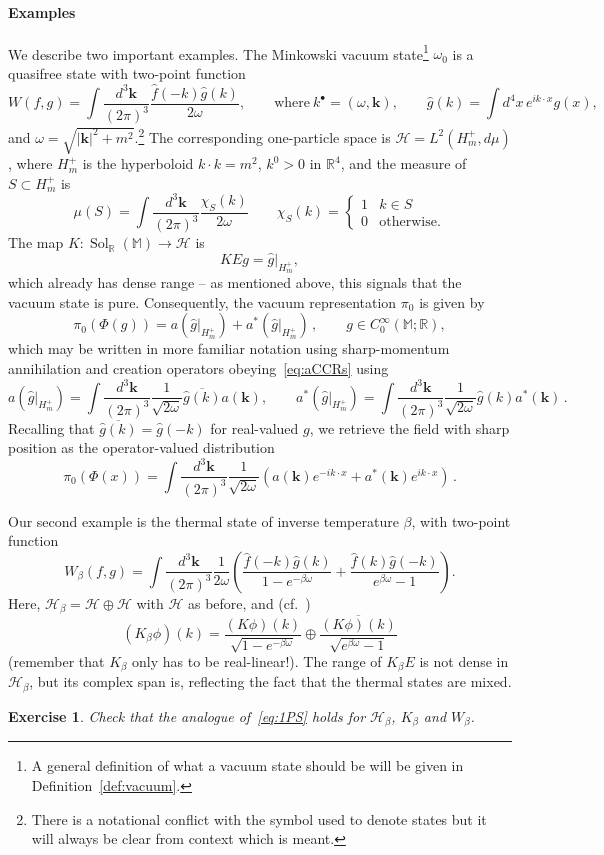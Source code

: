 \documentclass[12pt,a4paper]{article}
\newcommand{\1}{\mathds{1}}                         %
\newcommand{\RR}{\mathbb{R}}           %
\newcommand{\MM}{\mathbb{M}}
\newcommand{\HH}{{\mathcal{H}}}
\newcommand{\kb}{{\boldsymbol{k}}}
\newcommand{\CoinX}[1]{C_0^\infty(#1)}
\newtheorem{exercise}[theorem]{Exercise}
\DeclareMathOperator{\Sol}{Sol}
\begin{document}
\paragraph{Examples} We describe two important examples. The Minkowski vacuum state\footnote{A general definition of what a vacuum state should be will be given in Definition~\ref{def:vacuum}.} $\omega_0$ is a quasifree state with two-point function 
\[
W(f,g) = \int\frac{d^3\kb}{(2\pi)^3} \frac{\hat{f}(-k) \hat{g}(k)}{2\omega}, \qquad \text{where}~k^\bullet =(\omega,\kb),
\qquad \hat{g}(k) = \int d^4x\, e^{ik\cdot x}g(x),
\]
and $\omega=\sqrt{|\boldsymbol{k}|^2+m^2}$.\footnote{There is a notational conflict with the symbol used to denote states but it will always be clear from context which is meant.} The corresponding
one-particle space is $\HH=L^2(H^+_{m},d\mu)$, where
$H^+_m$ is the hyperboloid $k\cdot k=m^2$, $k^0>0$ in $\RR^4$,
and the measure of $S\subset H^+_m$ is
\[
\mu(S) = \int \frac{d^3\kb}{(2\pi)^3} \frac{\chi_S(k)}{2\omega}\qquad \chi_S(k)=\begin{cases} 1 & k\in S\\ 0 & \text{otherwise.}\end{cases}
\]
The map $K:\Sol_\RR(\MM)\to\HH$ is 
\[
KEg = \hat{g}|_{H^+_m},
\]
which already has dense range -- as mentioned above, this signals that the vacuum state is pure. Consequently, the vacuum representation $\pi_0$ is given by
\[
\pi_0(\Phi(g))=a(\hat{g}|_{H^+_m})+a^*(\hat{g}|_{H^+_m})\,, \qquad g\in\CoinX{\MM;\RR},
\]
which may be written in more familiar notation using sharp-momentum annihilation and creation operators obeying~\eqref{eq:aCCRs} using
\[
a(\hat{g}|_{H^+_m})=\int\frac{d^3\boldsymbol{k}}{(2\pi)^3}\frac{1}{\sqrt{2\omega}} \overline{\hat{g}(k)} a(\boldsymbol{k}),\qquad a^*(\hat{g}|_{H^+_m})=\int\frac{d^3\boldsymbol{k}}{(2\pi)^3}\frac{1}{\sqrt{2\omega}} \hat{g}(k) a^*(\boldsymbol{k})\,.
\]
Recalling that $\overline{\hat{g}(k)}=\hat{g}(-k)$ for real-valued $g$, we retrieve the field with sharp position as the operator-valued distribution
\[
\pi_0(\Phi(x))=\int \frac{d^3\boldsymbol{k}}{(2\pi)^3}\frac{1}{\sqrt{2\omega}}\left(a(\boldsymbol{k})e^{-ik\cdot x}+a^*(\boldsymbol{k})e^{ik\cdot x}
\right)\,.
\]

Our second example is the thermal state of inverse temperature $\beta$, with two-point function
\[
W_\beta(f,g) = \int\frac{d^3\kb}{(2\pi)^3}\frac{1}{2\omega} \left(\frac{\hat{f}(-k) \hat{g}(k)}{1-e^{-\beta \omega}} +
\frac{\hat{f}(k) \hat{g}(-k)}{e^{\beta \omega}-1}\right).
\]
Here, $\HH_\beta=\HH\oplus\HH$ with $\HH$ as before, and (cf.~\cite{Kay:1985a})
\[
(K_\beta \phi)(k) = \frac{(K\phi)(k)}{\sqrt{1-e^{-\beta\omega}}} \oplus  \frac{\overline{(K\phi)(k)}}{\sqrt{e^{\beta\omega}-1}} 
\]
(remember that $K_\beta$ only has to be real-linear!). The range of $K_\beta E$ is not dense in $\HH_\beta$, but its complex span is, reflecting the fact that the thermal states are mixed.
\begin{exercise}
	Check that the analogue of~\eqref{eq:1PS} holds for $\HH_\beta$, $K_\beta$ and $W_\beta$.
\end{exercise}
\end{document}
